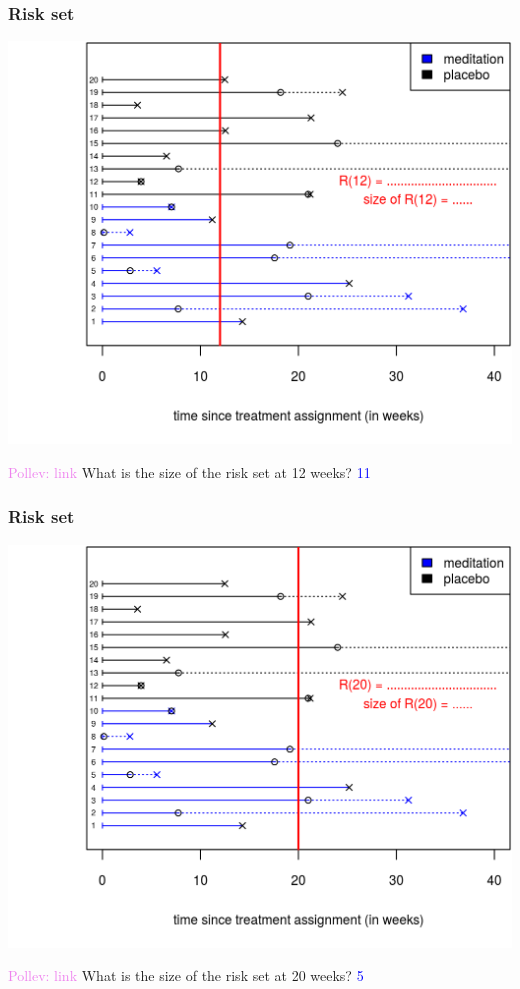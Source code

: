 \documentclass[10pt,t]{beamer}
\begin{document}
\begin{frame}
\frametitle{Risk set}
\begin{center}
\includegraphics[height=0.8\textheight]{figs/risk_set_movie_4.png}
\end{center}

\textcolor{violet}{Pollev: link} What is the size of the risk set at 12 weeks? \pause\textcolor{blue}{11}
\end{frame}

\begin{frame}
\frametitle{Risk set}
\begin{center}
\includegraphics[height=0.8\textheight]{figs/risk_set_movie_5.png}
\end{center}

\textcolor{violet}{Pollev: link} What is the size of the risk set at 20 weeks?  \pause\textcolor{blue}{5}
\end{frame}
\end{document}
